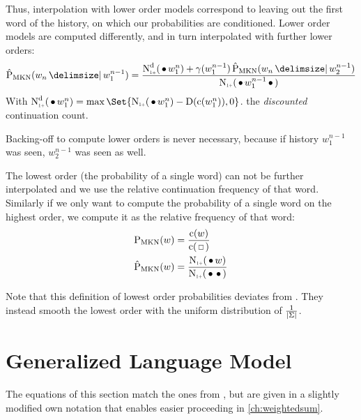 Thus, interpolation with lower order models correspond to leaving out the first
word of the history, on which our probabilities are conditioned.
Lower order models are computed differently, and in turn interpolated with
further lower orders:
\begin{equation}
  \label{eq:mkn-low}
  \ProbMKN*{w_n}{w_1^{n-1}} =
    \frac{\DiscountedCount*(\WSkp w_1^n) + \gamma(w_1^{n-1}) \ProbMKN*{w_n}{w_2^{n-1}}}
         {\ContCountIp(\WSkp w_1^{n-1} \WSkp)} \\
\end{equation}
With
${\DiscountedCount*(\WSkp w_1^n) = \max\Set{ \ContCountIp(\WSkp w_1^n) - \Discount(\Count(w_1^n)), 0 }}$.
the \emph{discounted} continuation count.

Backing-off to compute lower orders is never necessary, because
if history $w_1^{n-1}$ was seen, $w_2^{n-1}$ was seen as well.

The lowest order (the probability of a single word) can not be further
interpolated and we use the relative continuation frequency of that word.
Similarly if we only want to compute the probability of a single word on the
highest order, we compute it as the relative frequency of that word:
\begin{subequations}
  \label{eq:mkn-lowest}
  \begin{align}
    \label{eq:mkn-lowest-abs}
    \ProbMKN {w} &= \frac{\Count(w)}{\Count(\Skp)} \\
    \label{eq:mkn-lowest-cont}
    \ProbMKN*{w} &= \frac{\ContCountIp(\WSkp w)}{\ContCountIp(\WSkp \WSkp)}
  \end{align}
\end{subequations}

Note that this definition of lowest order probabilities deviates from
\textcite{ChenGoodman1999}.
They instead smooth the lowest order with the uniform distribution of
$\frac{1}{\left|\Sigma\right|}$.


\section{Generalized Language Model}
\label{sec:review-lm-glm}

The equations of this section match the ones from \textcite{Pickhardt2014},
but are given in a slightly modified own notation that enables easier proceeding
in \cref{ch:weightedsum}.

